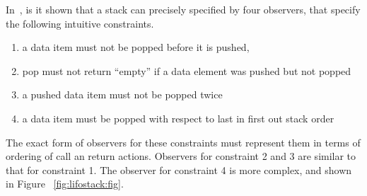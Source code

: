 

In~\cite{BEEH:icalp15}, is it shown that
a stack can precisely specified by four observers,
that specify the following intuitive constraints.
\begin{enumerate}
\item a data item must not be popped before it is pushed,
\item pop must not return ``empty'' if a data element was pushed but not
  popped
\item a pushed data item must not be popped twice
\item a data item must be popped with respect to last in first out stack order%
\end{enumerate}
The exact form of observers for these constraints must represent them in
terms of ordering of call an return actions. Observers for constraint
2 and 3 are similar to that for constraint 1. The observer for constraint
4 is more complex, and shown in Figure ~\ref{fig:lifostack:fig}.
